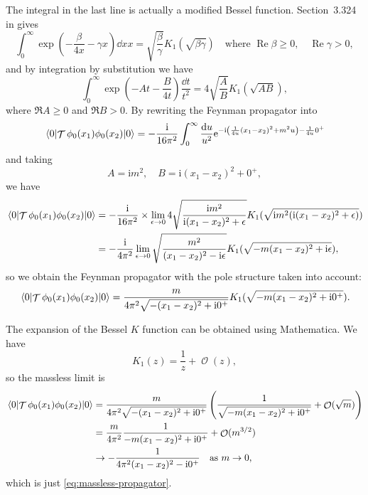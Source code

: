 \documentclass[hyperref, a4paper]{article}
\DeclareMathOperator{\timeorder}{\mathcal{T}}
\newcommand*{\ii}{\mathrm{i}}
\newcommand*{\ee}{\mathrm{e}}
\DeclareMathOperator{\bigO}{\mathcal{O}}
\begin{document}
The integral in the last line is actually a modified Bessel function. 
Section~3.324 in \cite{table-integral} gives 
\[
    \int_{0}^{\infty} \exp \left(-\frac{\beta}{4 x}-\gamma x\right) \dd{x} x=\sqrt{\frac{\beta}{\gamma}} K_{1}(\sqrt{\beta \gamma}) \quad\text{where } \operatorname{Re} \beta \geq 0, \quad \operatorname{Re} \gamma>0,
\]
and by integration by substitution we have 
\begin{equation}
    \int_0^\infty \exp(- A t - \frac{B}{4t}) \frac{\dd{t}}{t^2} = 4 \sqrt{\frac{A}{B}} K_1(\sqrt{AB}),
    \label{eq:bessel-2}
\end{equation}
where $\Re A \geq 0$ and $\Re B > 0$.
By rewriting the Feynman propagator into  
\[
    \expval*{\timeorder \phi_0(x_1) \phi_0(x_2)}{0} = - \frac{\ii}{16 \pi^2} \int_0^\infty \frac{\dd{u}}{u^2} \ee^{- \ii \left( \frac{1}{4u} (x_1 - x_2)^2 + m^2 u \right) - \frac{1}{4u} 0^+}
\]
and taking 
\[
    A = \ii m^2, \quad B = \ii (x_1 - x_2)^2 + 0^+, 
\]
we have 
\[
    \begin{aligned}
        \expval*{\timeorder \phi_0(x_1) \phi_0(x_2)}{0} &= - \frac{\ii}{16 \pi^2} \times \lim_{\epsilon \to 0} 4 \sqrt{\frac{\ii m^2}{\ii (x_1 - x_2)^2 + \epsilon}} K_1(\sqrt{ \ii m^2 (\ii (x_1 - x_2)^2 + \epsilon) }) \\
        &= - \frac{\ii}{4 \pi^2} \lim_{\epsilon \to 0} \sqrt{\frac{m^2}{ (x_1 - x_2)^2 - \ii \epsilon}} K_1(\sqrt{- m (x_1 - x_2)^2 + \ii \epsilon}),
    \end{aligned}
\]
so we obtain the Feynman propagator with the pole structure taken into account:
\begin{equation}
    \expval*{\timeorder \phi_0(x_1) \phi_0(x_2)}{0} = 
    \frac{m}{4 \pi^2 \sqrt{ - (x_1 - x_2)^2 + \ii 0^+ }} K_1(\sqrt{- m (x_1 - x_2)^2 + \ii 0^+}).
\end{equation}

The expansion of the Bessel $K$ function can be obtained using Mathematica.
We have 
\[
    K_1(z) = \frac{1}{z} + \bigO(z),
\]
so the massless limit is 
\[
    \begin{aligned}
        \expval*{\timeorder \phi_0(x_1) \phi_0(x_2)}{0} &= 
        \frac{m}{4 \pi^2 \sqrt{ - (x_1 - x_2)^2 + \ii 0^+ }} \left( \frac{1}{\sqrt{ - m (x_1 - x_2)^2 + \ii 0^+ }} + \bigO(\sqrt{m}) \right) \\
        &= \frac{m}{4\pi^2} \frac{1}{- m (x_1 - x_2)^2 + \ii 0^+ } + \bigO(m^{3/2}) \\
        &\to - \frac{1}{4 \pi^2 (x_1 - x_2)^2 - \ii 0^+} \quad \text{as $m \to 0$},
    \end{aligned}
\]
which is just \eqref{eq:massless-propagator}.
\end{document}
